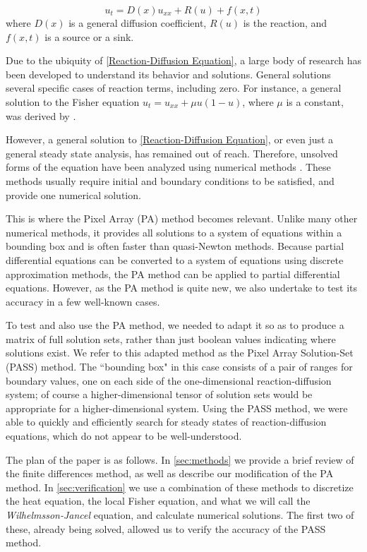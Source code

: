 \documentclass[11pt]{article}
\begin{document}
\begin{equation}
    \label{Reaction-Diffusion Equation}
    u_t = D(x)u_{xx} + R(u) + f(x,t)
\end{equation}
where $D(x)$ is a general diffusion coefficient, $R(u)$ is the reaction, and $f(x,t)$ is a source or a sink.

Due to the ubiquity of \cref{Reaction-Diffusion Equation}, a large body of research has been developed to understand its behavior and solutions. General solutions several specific cases of reaction terms, including zero. For instance, a general solution to the Fisher equation $u_t = u_{xx} + \mu u(1-u)$, where $\mu$ is a constant, was derived by \citep{AnalyticFisher}.

However, a general solution to \cref{Reaction-Diffusion Equation}, or even just a general steady state analysis, has remained out of reach. Therefore, unsolved forms of the equation have been analyzed using numerical methods \citep{Numerical_RD_1, Numerical_RD_2, Numerical_RD_3}. These methods usually require initial and boundary conditions to be satisfied, and provide one numerical solution.

This is where the Pixel Array (PA) method \citep{Introduction_to_PA} becomes relevant. Unlike many other numerical methods, it provides all solutions to a system of equations within a bounding box and is often faster than quasi-Newton methods. Because partial differential equations can be converted to a system of equations using discrete approximation methods, the PA method can be applied to partial differential equations. However, as the PA method is quite new, we also undertake to test its accuracy in a few well-known cases.

To test and also use the PA method, we needed to adapt it so as to produce a matrix of full solution sets, rather than just boolean values indicating where solutions exist. We refer to this adapted method as the Pixel Array Solution-Set (PASS) method. The ``bounding box" in this case consists of a pair of ranges for boundary values, one on each side of the one-dimensional reaction-diffusion system; of course a higher-dimensional tensor of solution sets would be appropriate for a higher-dimensional system. Using the PASS method, we were able to quickly and efficiently search for steady states of reaction-diffusion equations, which do not appear to be well-understood.

The plan of the paper is as follows. In \cref{sec:methods} we provide a brief review of the finite differences method, as well as describe our modification of the PA method. In \cref{sec:verification} we use a combination of these methods to discretize the heat equation, the local Fisher equation, and what we will call the \textit{Wilhelmsson-Jancel} equation, and calculate numerical solutions. The first two of these, already being solved, allowed us to verify the accuracy of the PASS method.
\end{document}
